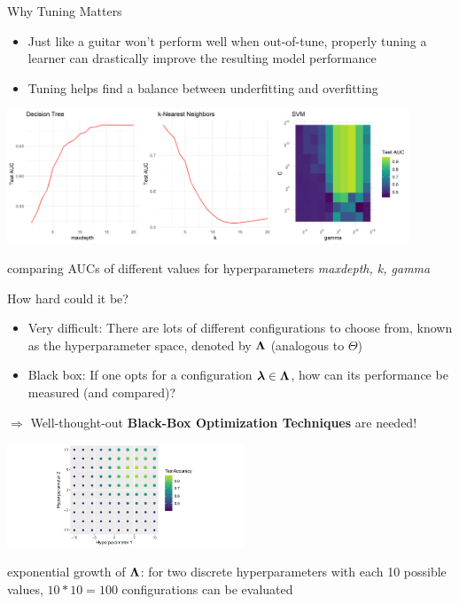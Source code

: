 \documentclass[11pt,compress,t,notes=noshow, xcolor=table]{beamer}
\begin{document}
\begin{vbframe}{Why Tuning Matters}
\begin{itemize}
\item \small Just like a guitar won't perform well when out-of-tune, properly tuning a learner can drastically improve the resulting model performance
\item \small Tuning helps find a balance between underfitting and overfitting
\end{itemize}

\begin{center}
\vspace{2em}
\includegraphics[width = 0.9\textwidth]{figure/tuning_importance.png}
\end{center}
\vspace{1em}
\begin{center}
\scriptsize comparing AUCs of different values for hyperparameters \textit{maxdepth, k, gamma}
\end{center}

\end{vbframe}



\begin{vbframe}{How hard could it be?}
\begin{itemize}
\item \small Very difficult: There are lots of different configurations to choose from, known as the hyperparameter space, denoted by $\bm{\Lambda}$ (analogous to $\Theta$)
\item \small Black box: If one opts for a configuration $\bm{\lambda} \in \bm{\Lambda}$, how can its performance be measured (and compared)?
\end{itemize}

$\Rightarrow$ Well-thought-out \textbf{Black-Box Optimization Techniques} are needed!

\begin{center}
\vspace{2em}
\includegraphics[width=200pt]{figure/cart_tuning_balgos_1.pdf}
\end{center}

\begin{center}
\scriptsize exponential growth of $\bm{\Lambda}$: for two discrete hyperparameters with each 10 possible values, $10 * 10 = 100$ configurations can be evaluated
\end{center}

\end{vbframe}
\end{document}

